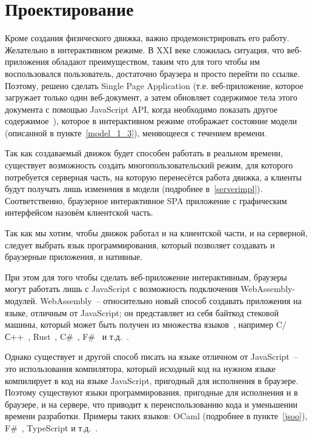 \chapter{Проектирование}\label{chapter-design}

Кроме создания физического движка, важно продемонстрировать его работу.
Желательно в интерактивном режиме. В XXI веке сложилась ситуация, что веб-приложения
обладают преимуществом, таким что для того чтобы им воспользовался пользователь, достаточно
браузера и просто перейти по ссылке.
Поэтому, решено сделать Single Page Application
(т.е. веб-приложение, которое загружает только один веб-документ,
а затем обновляет содержимое тела этого документа с помощью JavaScript API,
когда необходимо показать другое содержимое~\cite{mdn-spa}),
которое в интерактивном режиме отображает состояние модели (описанной в пункте~\ref{model_1_3}),
меняющееся с течением времени.

Так как создаваемый движок будет способен работать в реальном времени, существует возможность
создать многопользовательский режим, для которого потребуется серверная часть,
на которую перенесётся работа движка, а клиенты будут получать лишь изменения в модели (подробнее в~\ref{serverimpl}).
Соответственно, браузерное интерактивное SPA приложение с графическим интерфейсом назовём клиентской часть.

Так как мы хотим, чтобы движок работал и на клиентской части, и на серверной, следует выбрать язык программирования,
который позволяет создавать и браузерные приложения, и нативные.

При этом для того чтобы сделать веб-приложение интерактивным, браузеры могут работать лишь с JavaScript
с возможность подключения WebAssembly-модулей. WebAssembly~-- относительно новый способ создавать
приложения на языке, отличным от JavaScript; он представляет из себя байткод стековой машины,
который может быть получен из множества языков~\cite{wasm}, например
C/С++~\cite{emscripten-about}, Rust~\cite{rust-wasm}, C\#~\cite{blazor-ru}, F\#~\cite{fsbolero} и т.д.~\cite{wasm-iwantto}.

Однако существует и другой способ
писать на языке отличном от JavaScript~-- это использования компилятора, который исходный код на нужном языке
компилирует в код на языке JavaScript, пригодный для исполнения в браузере. Поэтому существуют языки программирования,
пригодные для исполнения и в браузере, и на сервере, что приводит к переиспользованию кода и уменьшении времени разработки.
Примеры таких языков: OCaml (подробнее в пункте~\ref{jsoo}), F\#~\cite[с.~48]{dsyme-hopl}, TypeScript и т.д.~\cite{typescript-mayorov}.

